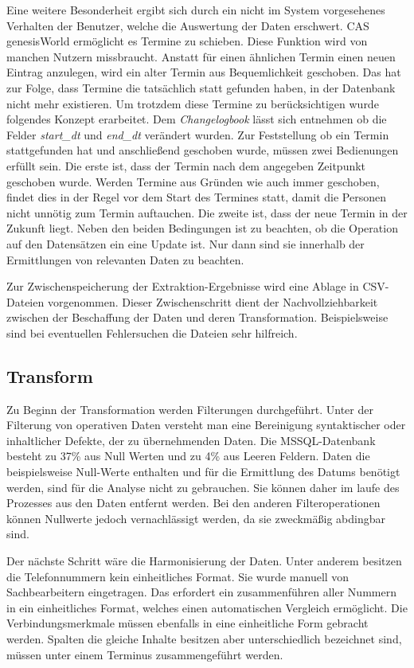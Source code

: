Eine weitere Besonderheit ergibt sich durch ein nicht im System vorgesehenes Verhalten der Benutzer, welche die Auswertung der Daten erschwert. CAS genesisWorld ermöglicht es Termine zu schieben. Diese Funktion wird von manchen Nutzern missbraucht. Anstatt für einen ähnlichen Termin einen neuen Eintrag anzulegen, wird ein alter Termin aus Bequemlichkeit geschoben. Das hat zur Folge, dass Termine die tatsächlich statt gefunden haben, in der Datenbank nicht mehr existieren. Um trotzdem diese Termine zu berücksichtigen wurde folgendes Konzept erarbeitet. Dem \textit{Changelogbook} lässt sich entnehmen ob die Felder \textit{start\_dt} und \textit{end\_dt} verändert wurden. Zur Feststellung ob ein Termin stattgefunden hat und anschließend geschoben wurde, müssen zwei Bedienungen erfüllt sein. Die erste ist, dass der Termin nach dem angegeben Zeitpunkt geschoben wurde. Werden Termine aus Gründen wie auch immer geschoben, findet dies in der Regel vor dem Start des Termines statt, damit die Personen nicht unnötig zum Termin auftauchen. Die zweite ist, dass der neue Termin in der Zukunft liegt. Neben den beiden Bedingungen ist zu beachten, ob die Operation auf den Datensätzen ein eine Update ist. Nur dann sind sie innerhalb der Ermittlungen von relevanten Daten zu beachten.

Zur Zwischenspeicherung der Extraktion-Ergebnisse wird eine Ablage in CSV-Dateien vorgenommen. Dieser Zwischenschritt dient der Nachvollziehbarkeit zwischen der Beschaffung der Daten und deren Transformation. Beispielsweise sind bei eventuellen Fehlersuchen die Dateien sehr hilfreich.  

\subsection{Transform}

Zu Beginn der Transformation werden Filterungen durchgeführt. Unter der Filterung von operativen Daten versteht man eine Bereinigung syntaktischer oder inhaltlicher Defekte, der zu übernehmenden Daten. Die MSSQL-Datenbank besteht zu 37\% aus Null Werten und zu 4\% aus Leeren Feldern. Daten die beispielsweise Null-Werte enthalten und für die Ermittlung des Datums benötigt werden, sind für die Analyse nicht zu gebrauchen. Sie können daher im laufe des Prozesses aus den Daten entfernt werden. Bei den anderen Filteroperationen können Nullwerte jedoch vernachlässigt werden, da sie zweckmäßig abdingbar sind.

Der nächste Schritt wäre die Harmonisierung der Daten. Unter anderem besitzen die Telefonnummern kein einheitliches Format. Sie wurde manuell von Sachbearbeitern eingetragen. Das erfordert ein zusammenführen aller Nummern in ein einheitliches Format, welches einen automatischen Vergleich ermöglicht. Die Verbindungsmerkmale müssen ebenfalls in eine einheitliche Form gebracht werden. Spalten die gleiche Inhalte besitzen aber unterschiedlich bezeichnet sind, müssen unter einem Terminus zusammengeführt werden. 

